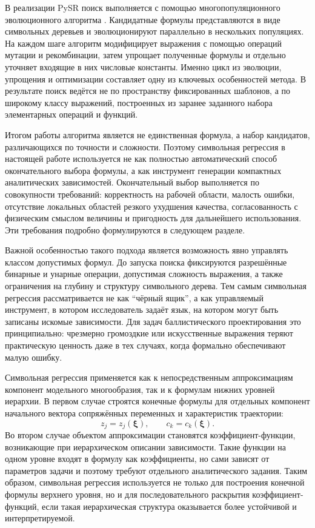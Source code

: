 В реализации PySR поиск выполняется с помощью многопопуляционного эволюционного алгоритма \cite{cranmer_pysr_2023}. Кандидатные формулы представляются в виде символьных деревьев и эволюционируют параллельно в нескольких популяциях. На каждом шаге алгоритм модифицирует выражения с помощью операций мутации и рекомбинации, затем упрощает полученные формулы и отдельно уточняет входящие в них числовые константы. Именно цикл из эволюции, упрощения и оптимизации составляет одну из ключевых особенностей метода. В результате поиск ведётся не по пространству фиксированных шаблонов, а по широкому классу выражений, построенных из заранее заданного набора элементарных операций и функций.

Итогом работы алгоритма является не единственная формула, а набор кандидатов, различающихся по точности и сложности. Поэтому символьная регрессия в настоящей работе используется не как полностью автоматический способ окончательного выбора формулы, а как инструмент генерации компактных аналитических зависимостей. Окончательный выбор выполняется по совокупности требований: корректность на рабочей области, малость ошибки, отсутствие локальных областей резкого ухудшения качества, согласованность с физическим смыслом величины и пригодность для дальнейшего использования. Эти требования подробно формулируются в следующем разделе.

Важной особенностью такого подхода является возможность явно управлять классом допустимых формул. До запуска поиска фиксируются разрешённые бинарные и унарные операции, допустимая сложность выражения, а также ограничения на глубину и структуру символьного дерева. Тем самым символьная регрессия рассматривается не как ``чёрный ящик'', а как управляемый инструмент, в котором исследователь задаёт язык, на котором могут быть записаны искомые зависимости. Для задач баллистического проектирования это принципиально: чрезмерно громоздкие или искусственные выражения теряют практическую ценность даже в тех случаях, когда формально обеспечивают малую ошибку.

Символьная регрессия применяется как к непосредственным аппроксимациям компонент модельного многообразия, так и к формулам нижних уровней иерархии. В первом случае строятся конечные формулы для отдельных компонент начального вектора сопряжённых переменных и характеристик траектории:
\begin{equation}
	z_j=z_j(\boldsymbol\xi),
	\qquad
	c_k=c_k(\boldsymbol\xi).
\end{equation}
Во втором случае объектом аппроксимации становятся коэффициент-функции, возникающие при иерархическом описании зависимости. Такие функции на одном уровне входят в формулу как коэффициенты, но сами зависят от параметров задачи и поэтому требуют отдельного аналитического задания. Таким образом, символьная регрессия используется не только для построения конечной формулы верхнего уровня, но и для последовательного раскрытия коэффициент-функций, если такая иерархическая структура оказывается более устойчивой и интерпретируемой.

